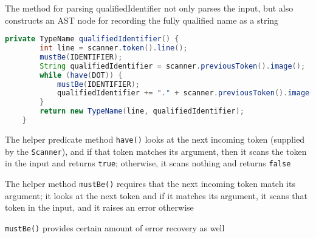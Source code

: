 \documentclass[8pt,a4paper,compress]{beamer}
\begin{document}
\begin{frame}[fragile]
\pause

The method for parsing qualifiedIdentifier not only parses the input, but also constructs an AST node for recording the fully qualified name as a string

\begin{lstlisting}[language=Java]
    private TypeName qualifiedIdentifier() {
        int line = scanner.token().line();
        mustBe(IDENTIFIER);
        String qualifiedIdentifier = scanner.previousToken().image();
        while (have(DOT)) {
            mustBe(IDENTIFIER);
            qualifiedIdentifier += "." + scanner.previousToken().image();
        }
        return new TypeName(line, qualifiedIdentifier);
    }
\end{lstlisting}

\pause
\bigskip

The helper predicate method \lstinline{have()} looks at the next incoming token (supplied by the \lstinline{Scanner}), and if that token matches its argument, then it scans the token in the input and returns \lstinline{true}; otherwise, it scans nothing and returns \lstinline{false}

\pause
\bigskip

The helper method \lstinline{mustBe()} requires that the next incoming token match its argument; it looks at the next token and if it matches its argument, it scans that token in the input, and it raises an error otherwise

\pause
\bigskip

\lstinline{mustBe()} provides certain amount of error recovery as well
\end{frame}
\end{document}
